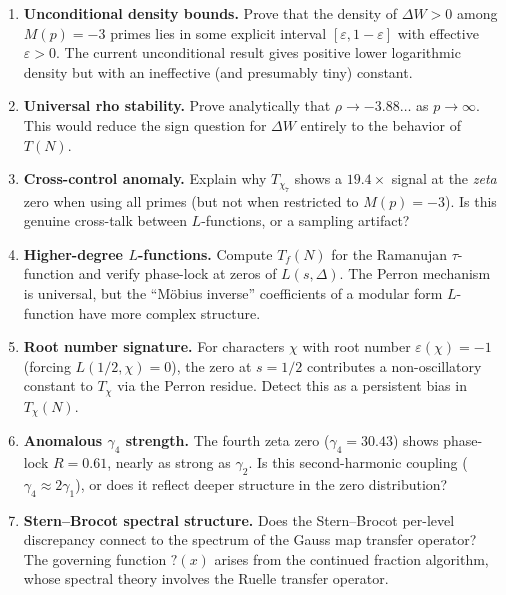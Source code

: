 \documentclass[11pt]{article}
\theoremstyle{definition}
\begin{document}
\begin{enumerate}
  \item \textbf{Unconditional density bounds.}
    Prove that the density of $\Delta W > 0$ among $M(p) = -3$ primes
    lies in some explicit interval $[\varepsilon, 1-\varepsilon]$ with
    effective~$\varepsilon > 0$.  The current unconditional result gives
    positive lower logarithmic density but with an ineffective (and
    presumably tiny) constant.

  \item \textbf{Universal rho stability.}
    Prove analytically that $\rho \to -3.88\ldots$ as $p \to \infty$.
    This would reduce the sign question for $\Delta W$ entirely to the
    behavior of $T(N)$.

  \item \textbf{Cross-control anomaly.}
    Explain why $T_{\chi_7}$ shows a $19.4\times$ signal at the
    \emph{zeta} zero when using all primes (but not when restricted to
    $M(p) = -3$).  Is this genuine cross-talk between $L$-functions,
    or a sampling artifact?

  \item \textbf{Higher-degree $L$-functions.}
    Compute $T_f(N)$ for the Ramanujan $\tau$-function and verify
    phase-lock at zeros of $L(s, \Delta)$.  The Perron mechanism
    is universal, but the ``M\"obius inverse'' coefficients of a
    modular form $L$-function have more complex structure.

  \item \textbf{Root number signature.}
    For characters $\chi$ with root number $\varepsilon(\chi) = -1$
    (forcing $L(1/2, \chi) = 0$), the zero at $s = 1/2$ contributes
    a non-oscillatory constant to $T_\chi$ via the Perron residue.
    Detect this as a persistent bias in $T_\chi(N)$.

  \item \textbf{Anomalous $\gamma_4$ strength.}
    The fourth zeta zero ($\gamma_4 = 30.43$) shows phase-lock
    $R = 0.61$, nearly as strong as $\gamma_2$.  Is this
    second-harmonic coupling ($\gamma_4 \approx 2\gamma_1$), or does
    it reflect deeper structure in the zero distribution?

  \item \textbf{Stern--Brocot spectral structure.}
    Does the Stern--Brocot per-level discrepancy connect to the
    spectrum of the Gauss map transfer operator?  The governing
    function $?(x)$ arises from the continued fraction algorithm,
    whose spectral theory involves the Ruelle transfer operator.


\end{enumerate}
\end{document}
